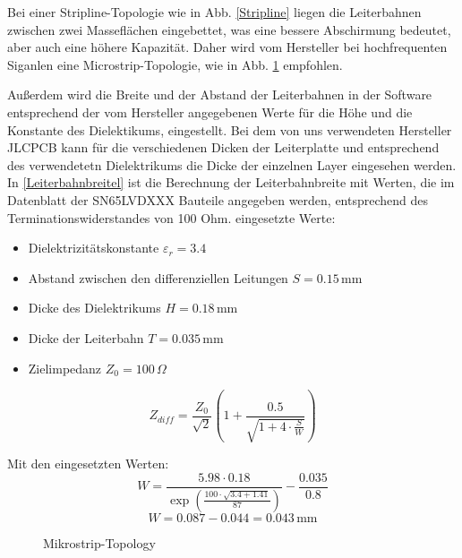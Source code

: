  
Bei einer Stripline-Topologie wie in Abb. \ref{Stripline} liegen die Leiterbahnen zwischen zwei Masseflächen eingebettet, was eine bessere Abschirmung bedeutet, aber auch eine höhere Kapazität. Daher wird vom Hersteller bei hochfrequenten Siganlen eine Microstrip-Topologie, wie in Abb. \ref{MikrostripTopology} empfohlen. 



Außerdem wird die Breite und der Abstand der Leiterbahnen in der Software entsprechend der vom Hersteller angegebenen Werte für die Höhe und die Konstante des Dielektikums, eingestellt. Bei dem von uns verwendeten Hersteller JLCPCB kann für die verschiedenen Dicken der Leiterplatte und entsprechend des verwendetetn Dielektrikums die Dicke der einzelnen Layer eingesehen werden. 
In \ref{Leiterbahnbreitel} ist die Berechnung der Leiterbahnbreite mit Werten, die im Datenblatt der SN65LVDXXX Bauteile angegeben werden, entsprechend des Terminationswiderstandes von 100 Ohm.
\newline
eingesetzte Werte:
\begin{itemize}
	\item Dielektrizitätskonstante \( \varepsilon_r = 3.4 \)
	\item Abstand zwischen den differenziellen Leitungen \( S = 0.15 \, \text{mm} \)
	\item Dicke des Dielektrikums \( H = 0.18 \, \text{mm} \)
	\item Dicke der Leiterbahn \( T = 0.035 \, \text{mm} \)
	\item Zielimpedanz \( Z_0 = 100 \, \Omega \)
\end{itemize}



\begin{equation} \label{Impedanz}
	Z_{diff} = \frac{Z_0}{\sqrt{2}} \left( 1 + \frac{0.5}{\sqrt{1 + 4\cdot \frac{S}{W}}} \right)
\end{equation}


Mit den eingesetzten Werten:
\begin{equation} \label{Leiterbahnbreite}
W = \frac{5.98 \cdot 0.18}{\exp\left(\frac{100 \cdot \sqrt{3.4 + 1.41}}{87}\right)} - \frac{0.035}{0.8}

\end{equation}
\begin{equation} \label{Leiterbahnbreite}
W = 0.087 - 0.044 = 0.043 \, \text{mm}
\end{equation}


\begin{figure}[H]
	\centering    
	\caption{Mikrostrip-Topology}
	\label{MikrostripTopology}
\end{figure}

